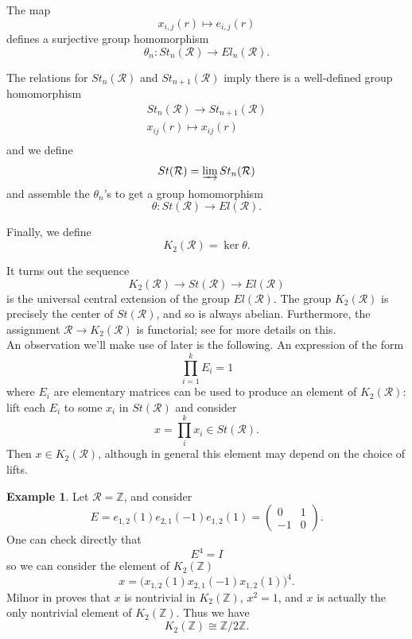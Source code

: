 \documentclass{amsart}
\newcommand{\si}{\index}
\theoremstyle{definition}
\newtheorem{ex}[equation]{Example}
\theoremstyle{definition}
\newcommand{\calR}{\mathcal{R}}
\numberwithin{equation}{subsection}
\begin{document}
The map
$$x_{i,j}(r) \mapsto e_{i,j}(r)$$
defines a surjective group homomorphism
$$\theta_{n} \colon St_{n}(\calR) \to El_{n}(\calR).$$

The relations for $St_{n}(\calR)$ and $St_{n+1}(\calR)$ imply there is a well-defined group homomorphism
\begin{equation*}
\begin{gathered}
St_{n}(\calR) \to St_{n+1}(\calR)\\
x_{ij}(r) \mapsto x_{ij}(r)\\
\end{gathered}
\end{equation*}
and we define
$$St(\calR) = \varinjlim St_{n}(\calR)$$
and assemble the $\theta_{n}$'s to get a group homomorphism
$$\theta \colon St(\calR) \to El(\calR).$$

Finally, we define\si{$K_{2}$ of a ring}
$$K_{2}(\calR) = \ker \theta.$$

It turns out the sequence
$$K_{2}(\calR) \to St(\calR) \to El(\calR)$$
is the universal central extension of the group $El(\calR)$. The group $K_{2}(\calR)$ is precisely the center of $St(\calR)$, and so is always abelian. Furthermore, the assignment $\calR \to K_{2}(\calR)$ is functorial; see \cite[III, Sec.5]{WeibelBook} for more details on this.\\

An observation we'll make use of later is the following. An expression of the form
$$\prod_{i=1}^{k}E_{i} = 1$$
where $E_{i}$ are elementary matrices can be used to produce an element of $K_{2}(\calR)$: lift each $E_{i}$ to some $x_{i}$ in $St(\calR)$ and consider
$$x = \prod_{i}^{k}x_{i} \in St(\calR).$$
Then $x \in K_{2}(\calR)$, although in general this element may depend on the choice of lifts.\\

\begin{ex}
Let $\calR = \mathbb{Z}$, and consider
$$E = e_{1,2}(1)e_{2,1}(-1)e_{1,2}(1) = \begin{pmatrix} 0 & 1 \\ -1 & 0 \end{pmatrix}.$$
One can check directly that
$$E^{4} = I$$
so we can consider the element of $K_{2}(\mathbb{Z})$
$$x = \big(x_{1,2}(1)x_{2,1}(-1)x_{1,2}(1)\big)^{4}.$$
Milnor in \cite[Sec. 10]{MilnorBook} proves that $x$ is nontrivial in $K_{2}(\mathbb{Z})$, $x^{2} = 1$, and $x$ is actually the only nontrivial element of $K_{2}(\mathbb{Z})$. Thus we have
$$K_{2}(\mathbb{Z}) \cong \mathbb{Z}/2\mathbb{Z}.$$
\end{ex}
\end{document}
